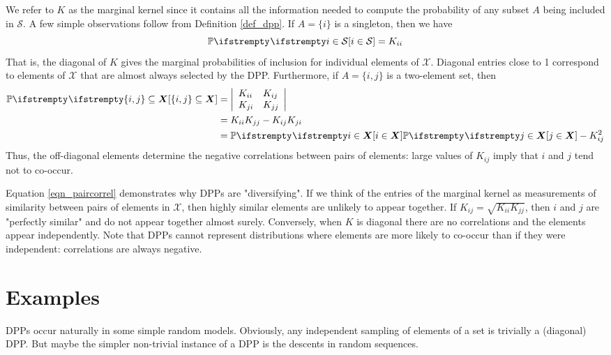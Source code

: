We refer to $K$ as the marginal kernel since it contains all the information needed to compute the probability of any subset $A$ being included in $\mathcal{S}$. A few simple observations follow from Definition \ref{def_dpp}. If $A=\{i\}$ is a singleton, then we have
\begin{equation*}
	\PP{}{i \in \mathcal{S}}=K_{i i}
\end{equation*}
That is, the diagonal of $K$ gives the marginal probabilities of inclusion for individual elements of $\mathcal{X}$. Diagonal entries close to 1 correspond to elements of $\mathcal{X}$ that are almost always selected by the DPP. Furthermore, if $A=\{i, j\}$ is a two-element set, then
\begin{equation}
    \label{eqn_paircorrel}
	\begin{aligned}
        \PP{}{\{i, j\} \subseteq \boldsymbol{X}} &=\left|\begin{array}{ll}
	K_{i i} & K_{i j} \\
	K_{j i} & K_{j j}
	\end{array}\right| \\
	&=K_{i i} K_{j j}-K_{i j} K_{j i} \\
	&=\PP{}{i \in \boldsymbol{X}} \PP{}{j \in \boldsymbol{X}}-K_{i j}^2
	\end{aligned}
\end{equation}
Thus, the off-diagonal elements determine the negative correlations between pairs of elements: large values of $K_{i j}$ imply that $i$ and $j$ tend not to co-occur.

Equation \ref{eqn_paircorrel} demonstrates why DPPs are "diversifying". If we think of the entries of the marginal kernel as measurements of similarity between pairs of elements in $\mathcal{X}$, then highly similar elements are unlikely to appear together. If $K_{i j}=\sqrt{K_{i i} K_{j j}}$, then $i$ and $j$ are "perfectly similar" and do not appear together almost surely. Conversely, when $K$ is diagonal there are no correlations and the elements appear independently. Note that DPPs cannot represent distributions where elements are more likely to co-occur than if they were independent: correlations are always negative.


\section{Examples}

DPPs occur naturally in some simple random models. Obviously, any independent sampling of elements of a set is trivially a (diagonal) DPP. But maybe the simpler non-trivial instance of a DPP is the descents in random sequences.


